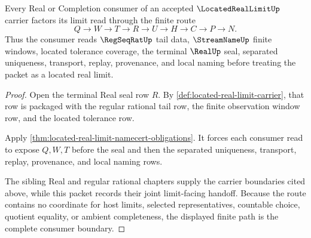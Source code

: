 \begin{theorem}
\label{thm:located-real-limit-tail-route}
Every Real or Completion consumer of an accepted $\LocatedRealLimitUp$ carrier factors its limit read through the finite route
$$
Q \to W \to T \to R \to U \to H \to C \to P \to N .
$$
Thus the consumer reads $\RegSeqRatUp$ tail data, $\StreamNameUp$ finite windows, located tolerance coverage, the terminal $\RealUp$ seal, separated uniqueness, transport, replay, provenance, and local naming before treating the packet as a located real limit.
\end{theorem}
\begin{proof}
Open the terminal Real seal row $R$. By \autoref{def:located-real-limit-carrier}, that row is packaged with the regular rational tail row, the finite observation window row, and the located tolerance row.

Apply \autoref{thm:located-real-limit-namecert-obligations}. It forces each consumer read to expose $Q,W,T$ before the seal and then the separated uniqueness, transport, replay, provenance, and local naming rows.

The sibling Real and regular rational chapters supply the carrier boundaries cited above, while this packet records their joint limit-facing handoff. Because the route contains no coordinate for host limits, selected representatives, countable choice, quotient equality, or ambient completeness, the displayed finite path is the complete consumer boundary.
\end{proof}





